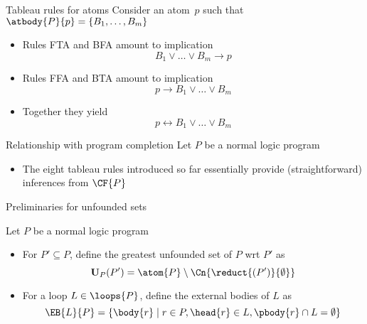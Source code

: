 \begin{frame}{Tableau rules for atoms}
Consider an atom~$p$ such that $\atbody{P}{p}=\{B_1,\dots,B_m\}$
\bigskip
\begin{itemize}
\item<1-> Rules FTA and BFA amount to implication
  \[
  B_1 \vee \dots \vee B_m \rightarrow p
  \]
\item<2-> Rules FFA and BTA amount to implication
  \[
  p \rightarrow B_1 \vee \dots \vee B_m
  \]
\item<3-> Together they yield
  \[
  p \leftrightarrow B_1 \vee \dots \vee B_m
  \]
\end{itemize}
\end{frame}
\begin{frame}{Relationship with program completion}
Let $P$ be a normal logic program

\begin{itemize}
\item <1-> The eight tableau rules introduced so far essentially provide
  (straightforward) inferences from $\CF{P}$  %
\end{itemize}
\end{frame}
\begin{frame}{Preliminaries for unfounded sets}

Let $P$ be a normal logic program
\begin{itemize}
\item<1-> For $P'\subseteq P$, define the \alert{greatest unfounded set} of $P$ wrt $P'$ as
\[
\mathbf{U}_P(P') = \atom{P}\setminus \Cn{\reduct{(P')}{\emptyset}}
\]
\item<2-> For a loop $L \in \loops{P}$, define the \alert{external bodies} of $L$ as
\[
\EB{L}{P} = \{\body{r} \mid r \in P, \head{r} \in L, \pbody{r} \cap L = \emptyset\}
\]
\end{itemize}
\end{frame}
